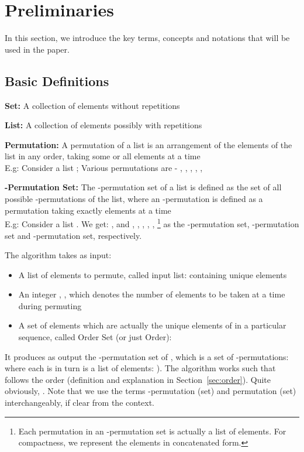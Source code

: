 \documentclass{article}
\begin{document}
\section{Preliminaries}
\label{sec:prelim}

In this section, we introduce the key terms, concepts and notations that will be used in the paper.

\subsection{Basic Definitions} 

\noindent \textbf{Set:} A collection of elements without repetitions

\noindent \textbf{List:} A collection of elements possibly with repetitions

\noindent \textbf{Permutation:} A permutation of a list is an arrangement of the elements of the list in any order, taking some or all elements at a time \\
E.g: Consider a list ; Various permutations are - , , , , , 

\noindent \textbf{-Permutation Set:} The -permutation set of a list is defined as the set of all possible -permutations of the list, where an -permutation is defined as a permutation taking exactly   elements at a time\\
E.g: Consider a list . We get: ,  and , , , , , \footnote{Each permutation in an -permutation set is actually a list of elements. For compactness, we represent the elements in concatenated form.} as the -permutation set, -permutation set and -permutation set, respectively.

The algorithm takes as input:
\begin{itemize}
 \item A list of  elements to permute, called input list:  containing  unique elements
 \item An integer , , which denotes the number of elements to be taken at a time during permuting
 \item A set of  elements which are actually the  unique elements of  in a particular sequence, called Order Set (or just Order): 
\end{itemize}

It produces as output the -permutation set of , which is a set of  -permutations:  where each  is in turn is a list of  elements:  ). The algorithm works such that  follows the order  (definition and explanation in Section~\ref{sec:order}). Quite obviously, . Note that we use the terms -permutation ({set}) and permutation ({set}) interchangeably, if clear from the context.
\end{document}
